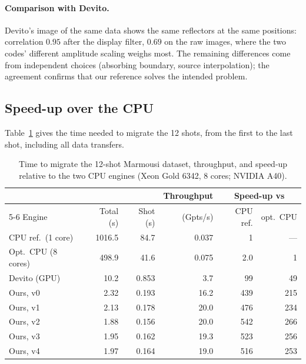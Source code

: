 \documentclass[letterpaper,11pt,leqno]{article}
\begin{document}
\paragraph{Comparison with Devito.} Devito's image of the same data shows the same reflectors at the same positions: correlation $0.95$ after the display filter, $0.69$ on the raw images, where the two codes' different amplitude scaling weighs most. The remaining differences come from independent choices (absorbing boundary, source interpolation); the agreement confirms that our reference solves the intended problem.

\subsection{Speed-up over the CPU}

Table~\ref{tab:speedup} gives the time needed to migrate the 12 shots, from the first to the last shot, including all data transfers.

\begin{table}[!htb]
\centering
\caption{Time to migrate the 12-shot Marmousi dataset, throughput, and
speed-up relative to the two CPU engines (Xeon Gold 6342, 8 cores; NVIDIA A40).}
\label{tab:speedup}
\begin{tabular}{lrrrrr}
\toprule
       &           &          & Throughput & \multicolumn{2}{c}{Speed-up vs} \\
\cmidrule(lr){5-6}
Engine & Total (s) & Shot (s) & (Gpts/s)   & CPU ref. & opt.\ CPU \\
\midrule
CPU ref.\ (1 core)       & 1016.5 & 84.7   & 0.037 & 1         & ---  \\
Opt.\ CPU (8 cores)      & 498.9  & 41.6   & 0.075 & 2.0       & 1    \\
Devito (GPU)             & 10.2   & 0.853  & 3.7   & 99        & 49   \\
Ours, v0                 & 2.32   & 0.193  & 16.2  & 439       & 215  \\
Ours, v1                 & 2.13   & 0.178  & 20.0  & 476       & 234  \\
Ours, v2                 & 1.88   & 0.156  & 20.0  & 542       & 266  \\
Ours, v3                 & 1.95   & 0.162  & 19.3  & 523       & 256  \\
Ours, v4                 & 1.97   & 0.164  & 19.0  & 516       & 253  \\
\bottomrule
\end{tabular}
\end{table}
\end{document}

